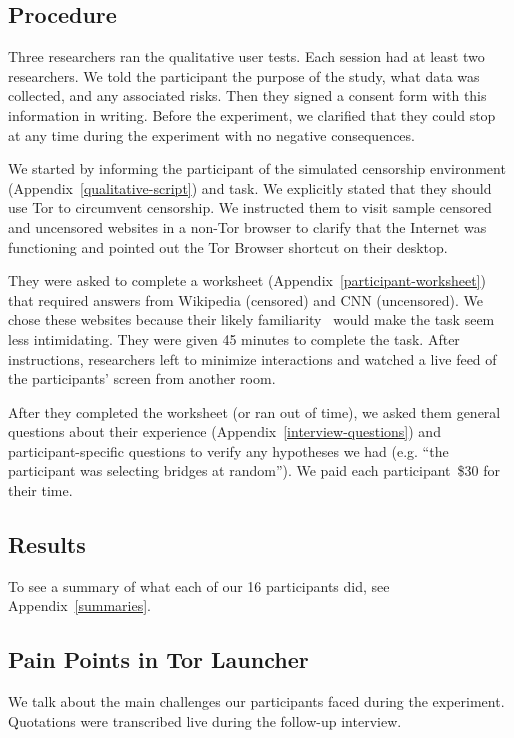 \documentclass[USenglish,oneside,twocolumn]{article}
\begin{document}
\subsection{Procedure}
Three researchers ran the qualitative user tests. Each session had at least two researchers.  
We told the participant the purpose of the 
study, what data was collected, and any associated risks. 
Then they signed a consent form with this information in writing. 
Before the experiment, we clarified that they could stop at any time during the experiment with no negative consequences. 

We started by informing the participant of the simulated censorship environment (Appendix~\ref{qualitative-script}) and task. We explicitly stated that they should use Tor to circumvent censorship. 
We instructed them to visit sample censored and uncensored websites
in a non-Tor browser to clarify that the Internet was functioning and
pointed out the Tor Browser shortcut on their desktop.

They were asked to complete a worksheet (Appendix~\ref{participant-worksheet}) that 
required answers from Wikipedia (censored) and CNN (uncensored).
We chose these websites because their likely familiarity~\cite{alexa}
would make the task seem less intimidating. They were given 45 minutes to complete the task. 
After instructions, researchers left to minimize interactions and watched a live feed of the participants' screen from another room.

After they completed the worksheet (or ran out of time),
we asked them general questions about their experience (Appendix~\ref{interview-questions}) and participant-specific questions to verify any hypotheses we had (e.g. ``the participant was selecting bridges at random''). We paid each participant~\$30 for their time. 

\subsection{Results} 

To see a summary of what each of our 16 participants did, see Appendix~\ref{summaries}. 

\subsection{Pain Points in Tor Launcher} 
\label{sec:pain-points}
We talk about the main challenges our participants faced during the experiment. 
Quotations were transcribed live during the follow-up interview.
\end{document}
